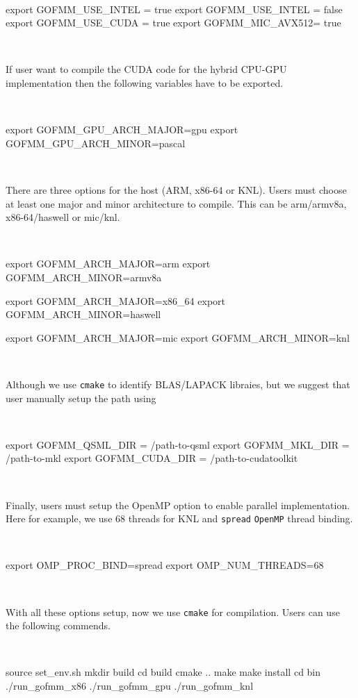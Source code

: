 \
\begin{verbnobox}[\small]
export GOFMM_USE_INTEL = true  %
export GOFMM_USE_INTEL = false %
export GOFMM_USE_CUDA  = true  %
export GOFMM_MIC_AVX512= true  %
\end{verbnobox}
\

If user want to compile the CUDA code for the hybrid CPU-GPU implementation
then the following variables have to be exported.

\
\begin{verbnobox}[\small]
export GOFMM_GPU_ARCH_MAJOR=gpu
export GOFMM_GPU_ARCH_MINOR=pascal
\end{verbnobox}
\

There are three options for the host (ARM, x86-64 or KNL). Users must 
choose at least one major and minor architecture to compile.
This can be arm/armv8a, x86-64/haswell or mic/knl.

\
\begin{verbnobox}[\small]
export GOFMM_ARCH_MAJOR=arm
export GOFMM_ARCH_MINOR=armv8a

export GOFMM_ARCH_MAJOR=x86_64
export GOFMM_ARCH_MINOR=haswell

export GOFMM_ARCH_MAJOR=mic
export GOFMM_ARCH_MINOR=knl
\end{verbnobox}
\

Although we use \texttt{cmake} to identify BLAS/LAPACK libraies, but we
suggest that user manually setup the path using

\
\begin{verbnobox}[\small]
export GOFMM_QSML_DIR = /path-to-qsml
export GOFMM_MKL_DIR = /path-to-mkl
export GOFMM_CUDA_DIR  = /path-to-cudatoolkit
\end{verbnobox}
\

Finally, users must setup the OpenMP option to enable parallel implementation.
Here for example, we use 68 threads for KNL and \texttt{spread}
\texttt{OpenMP} thread binding. 

\
\begin{verbnobox}[\small]
export OMP_PROC_BIND=spread
export OMP_NUM_THREADS=68
\end{verbnobox}
\

With all these options setup, now we use \texttt{cmake} for compilation. Users can use the following commends.

\
\begin{verbnobox}[\small]
source set_env.sh
mkdir build
cd build
cmake ..
make
make install
cd bin
./run_gofmm_x86
./run_gofmm_gpu
./run_gofmm_knl
\end{verbnobox}
\

